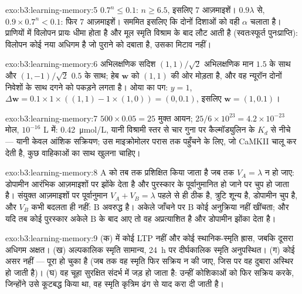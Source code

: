 \begin{solution}{exo:b3:learning-memory:5}
$0.7^{n} \le 0.1$: $n \ge 6.5$, इसलिए $7$ आज़माइशें। $0.9\lambda$ से,
$0.9\times 0.7^{n} < 0.1$: फिर $7$ आज़माइशें। सममित इसलिए कि दोनों
दिशाओं को वही $\alpha$ चलाता है। प्राणियों में विलोपन प्रायः धीमा होता
है और मूल स्मृति विश्राम के बाद लौट आती है (स्वतःस्फूर्त
पुनःप्राप्ति): विलोपन कोई नया अधिगम है जो पुराने को दबाता है, उसका मिटाव
नहीं।
\end{solution}

\begin{solution}{exo:b3:learning-memory:6}
अभिलक्षणिक सदिश $(1,1)/\sqrt{2}$ अभिलक्षणिक मान $1.5$ के साथ और
$(1,-1)/\sqrt{2}$ $0.5$ के साथ; हेब $\mathbf{w}$ को $(1,1)$ की ओर
मोड़ता है, और वह न्यूरॉन दोनों निवेशों के साथ दगने को पकड़ने लगता है।
ओया का पग: $y = 1$,
$\Delta\mathbf{w} = 0.1\times 1\times((1,1) - 1\times(1,0)) = (0,0.1)$,
इसलिए $\mathbf{w} = (1, 0.1)$।
\end{solution}

\begin{solution}{exo:b3:learning-memory:7}
$500\times 0.05 = 25$ मुक्त आयन; $25/6\times 10^{23} = 4.2\times 10^{-23}$
मोल, $10^{-16}$ L में: \qty{0.42}{\micro mol/L},
यानी विश्रामी स्तर से चार गुना पर कैल्मॉड्युलिन के $K_{d}$ से नीचे ---
यानी केवल आंशिक सक्रियण; उस माइक्रोमोलर परास तक पहुँचने के लिए, जो
CaMKII चालू कर देती है, कुछ वाहिकाओं का साथ खुलना चाहिए।
\end{solution}

\begin{solution}{exo:b3:learning-memory:8}
A को तब तक प्रशिक्षित किया जाता है जब तक $V_{A} = \lambda$ न हो जाए:
डोपामीन आरंभिक आज़माइशों पर झोंके देता है और पुरस्कार के पूर्वानुमानित
हो जाने पर चुप हो जाता है। संयुक्त आज़माइशों पर पूर्वानुमान
$V_{A} + V_{B} = \lambda$ पहले से ही ठीक है, त्रुटि शून्य है, डोपामीन
चुप है, और $V_{B}$ कभी बदलता ही नहीं: B अवरुद्ध है। अकेले जाँचने पर B
कोई अनुक्रिया नहीं खींचता; और यदि तब कोई पुरस्कार अकेले B के बाद आए तो
वह अप्रत्याशित है और डोपामीन झोंका देता है।
\end{solution}

\begin{solution}{exo:b3:learning-memory:9}
(क)  में कोई LTP नहीं और कोई स्थानिक-स्मृति ह्रास, जबकि दूसरा अधिगम
अक्षत। (ख) अल्पकालिक स्मृति सामान्य, \qty{24}{h} पर दीर्घकालिक स्मृति
अनुपस्थित। (ग) कोई असर नहीं ---  पूरा हो चुका है (जब तक वह
स्मृति फिर सक्रिय न की जाए, जिस पर वह दुबारा अस्थिर हो जाती है)। (घ) वह
चूहा सुरक्षित संदर्भ में जड़ हो जाता है: उन्हीं कोशिकाओं को फिर सक्रिय
करके, जिन्होंने उसे कूटबद्ध किया था, वह स्मृति कृत्रिम ढंग से याद करा
दी जाती है।
\end{solution}

